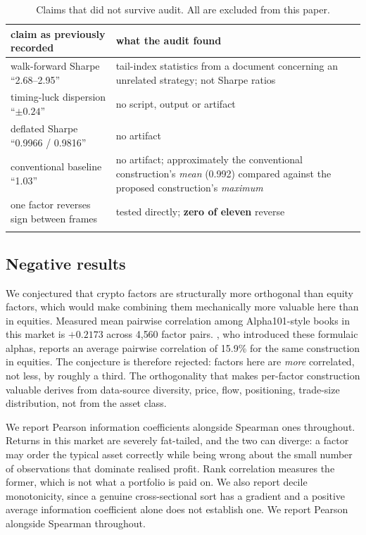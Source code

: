 \documentclass[11pt,letterpaper]{article}
\begin{document}
\begin{table}[!htbp]\centering
\caption{Claims that did not survive audit. All are excluded from this paper.}
\label{tab:audit}
\begin{tabular}{p{}p{}}
\toprule
claim as previously recorded & what the audit found \\
\midrule\addlinespace[2pt]
walk-forward Sharpe ``2.68--2.95'' & tail-index statistics from a document concerning an unrelated strategy; not Sharpe ratios \\
timing-luck dispersion ``$\pm0.24$'' & no script, output or artifact \\
deflated Sharpe ``0.9966 / 0.9816'' & no artifact \\
conventional baseline ``1.03'' & no artifact; approximately the conventional construction's \emph{mean} (0.992) compared against the proposed construction's \emph{maximum} \\
one factor reverses sign between frames & tested directly; \textbf{zero of eleven} reverse \\
\addlinespace[2pt]
\bottomrule
\end{tabular}
\end{table}

\subsection{Negative results}

We conjectured that crypto factors are structurally more orthogonal than equity
factors, which would make combining them mechanically more valuable here than in
equities. Measured mean pairwise correlation among Alpha101-style books in this
market is $+0.2173$ across 4{,}560 factor pairs. \citet{kakushadze2016}, who
introduced these formulaic alphas, reports an average pairwise correlation of
15.9\% for the same construction in equities. The conjecture is therefore
rejected: factors here are \emph{more} correlated, not less, by roughly a third. The orthogonality that makes per-factor construction
valuable derives from data-source diversity, price, flow, positioning,
trade-size distribution, not from the asset class.

We report Pearson information coefficients alongside Spearman ones throughout.
Returns in this market are severely fat-tailed, and the two can diverge: a factor
may order the typical asset correctly while being wrong about the small number of
observations that dominate realised profit. Rank correlation measures the former,
which is not what a portfolio is paid on. We also report decile monotonicity,
since a genuine cross-sectional sort has a gradient and a positive average
information coefficient alone does not establish one. We report Pearson alongside Spearman throughout.
\end{document}
